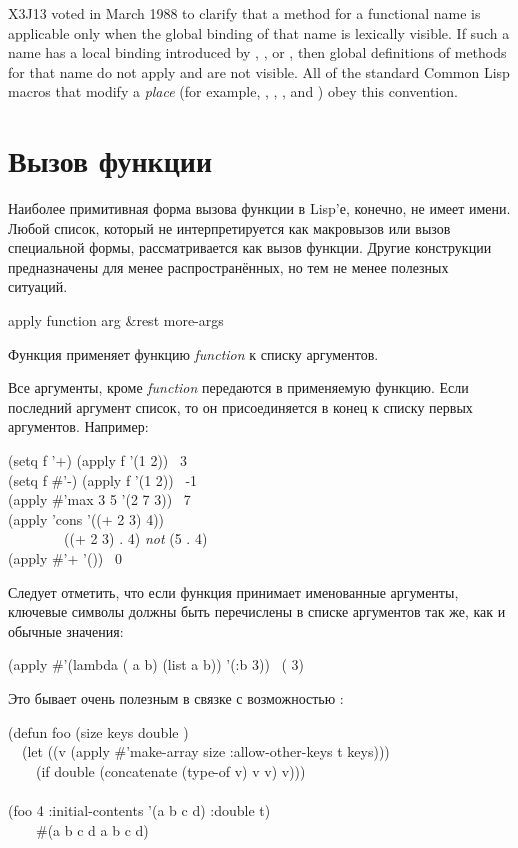\begin{newer}
X3J13 voted in March 1988 
to clarify that a  method for a functional name is applicable
only when the global binding of that name is lexically visible.
If such a name has a local binding introduced by , ,
or , then global definitions of  methods for
that name do not apply and are not visible.  All of the standard Common Lisp
macros that modify a  \emph{place} (for example,
, , , and ) obey this convention.
\end{newer}

\section{Вызов функции}

Наиболее примитивная форма вызова функции в Lisp'е, конечно, не имеет
имени. Любой список, который не интерпретируется как макровызов или вызов
специальной формы, рассматривается как вызов функции.
Другие конструкции предназначены для менее распространённых, но тем не менее
полезных ситуаций.

\begin{defun}[Функция]
apply function arg &rest more-args

Функция применяет функцию \emph{function} к списку аргументов.

Все аргументы, кроме \emph{function} передаются в применяемую функцию.
Если последний аргумент список, то он присоединяется в конец к списку первых
аргументов. Например:
\begin{lisp}
(setq f '+) (apply f '(1 2)) \EV\ 3 \\
(setq f \#'-) (apply f '(1 2)) \EV\ -1 \\
(apply \#'max 3 5 '(2 7 3)) \EV\ 7 \\
(apply 'cons '((+ 2 3) 4)) {\EV} \\
~~~~~~~~((+ 2 3) . 4)	\emph{not} (5 . 4) \\
(apply \#'+ '()) \EV\ 0
\end{lisp}
Следует отметить, что если функция принимает именованные аргументы, ключевые
символы должны быть перечислены в списке аргументов так же, как и обычные
значения:
\begin{lisp}
(apply \#'(lambda ( a b) (list a b)) '(:b 3)) \EV\ ({\nil} 3)
\end{lisp}
Это бывает очень полезным в связке с возможностью :
\begin{lisp}
(defun foo (size  keys  double ) \\
~~(let ((v (apply \#'make-array size :allow-other-keys t keys))) \\
~~~~(if double (concatenate (type-of v) v v) v))) \\
 \\
(foo 4 :initial-contents '(a b c d) :double t) \\
~~~\EV\ \#(a b c d a b c d)
\end{lisp}
\end{defun}

